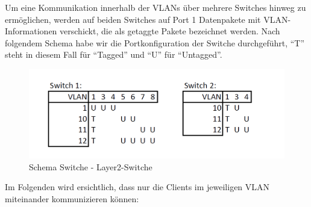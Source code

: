         Um eine Kommunikation innerhalb der VLANs über mehrere Switches hinweg zu 
        ermöglichen, werden auf beiden Switches auf Port 1 Datenpakete mit 
        VLAN-Informationen verschickt, die als getaggte Pakete bezeichnet werden.
        Nach folgendem Schema habe wir die Portkonfiguration der Switche durchgeführt, 
        "`T"' steht in diesem Fall für "`Tagged"' und "`U"' für "`Untagged"'.
        \begin{figure}[H]
            \centering
            \includegraphics[width=\linewidth]{images/Einrichtung Layer2-Switche/Schema_SwitchKonfiguration_Tagged_untagged.png}
            \caption{Schema Switche - Layer2-Switche}
        \end{figure}
        \newpage
        Im Folgenden wird ersichtlich, dass nur die Clients im jeweiligen VLAN miteinander kommunizieren können:
